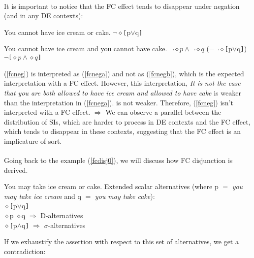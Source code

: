 \documentclass[a4paper,11pt]{article}
\newcommand{\reff}[1]{(\ref{#1})}
\begin{document}
\paragraph{}
It is important to notice that the FC effect tends to disappear under negation (and in any DE contexts):
\begin{exe}
\ex\label{fcneg} You cannot have ice cream or cake. $\neg\diamond$\verb![!p$\vee$q\verb!]!\begin{xlist}
\ex\label{fcnega} You cannot have ice cream and you cannot have cake. $\neg\diamond p\wedge\neg\diamond q$ (=$\neg\diamond$\verb![!p$\vee$q\verb!]!)
\ex\label{fcnegb} $\neg$\verb![!$\diamond p\wedge\diamond q$\verb!]!
\end{xlist}
\end{exe}
\reff{fcneg} is interpreted as \reff{fcnega} and not as \reff{fcnegb}, which is the expected interpretation with a FC effect. However, this interpretation, \textit{It is not the case that you are both allowed to have ice cream and allowed to have cake} is weaker than the interpretation in \reff{fcnega}. is not weaker. Therefore, \reff{fcneg} isn't interpreted with a FC effect.
$\Rightarrow$ We can observe a parallel between the distribution of SIs, which are harder to process in DE contexts and the FC effect, which tends to disappear in these contexts, suggesting that the FC effect is an implicature of sort.
\paragraph{}
Going back to the example \reff{fcdisj0}, we will discuss how FC disjunction is derived.

\begin{exe}
	\ex\label{fcdisj}
		\begin{xlist}
			\ex\label{fcdisja} You may take ice cream or cake.
			\ex\label{fcdisjb} Extended scalar alternatives (where p $=$ \emph{you may take ice cream} and q $=$ \emph{you may take cake}):\\
				\indent \hspace{4cm} $\diamond$\verb![!p$\vee$q\verb!]!\\[0.2cm]
				\indent \hspace{2.5cm} $\diamond$p \hspace{3.25cm} $\diamond$q \hfill $\Rightarrow$ D-alternatives\\[0.2cm]
				\indent \hspace{4cm} $\diamond$\verb![!p$\wedge$q\verb!]! \hfill $\Rightarrow$ $\sigma$-alternatives
		\end{xlist}
\end{exe}
\vspace{0.3cm}
If we exhaustify the assertion with respect to this set of alternatives, we get a contradiction:
\end{document}
